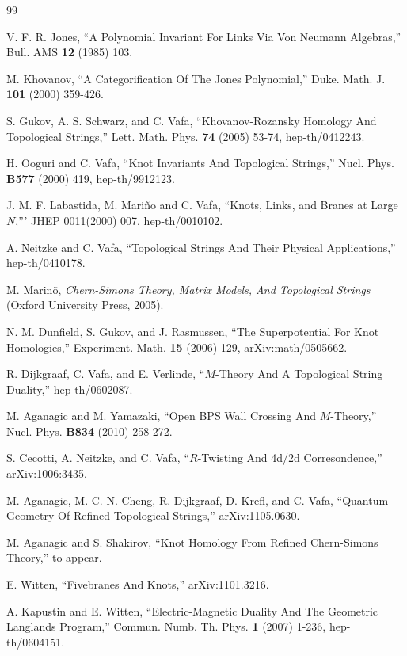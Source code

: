 
\begin{thebibliography}{99}


V. F. R. Jones, ``A Polynomial Invariant For Links Via Von Neumann Algebras,'' Bull.
AMS {\bf{12}} (1985) 103.

M. Khovanov, ``A Categorification Of The Jones Polynomial,'' Duke. Math. J. {\bf
101} (2000)
359-426.

S. Gukov, A. S. Schwarz, and C. Vafa,
``Khovanov-Rozansky Homology And Topological Strings,''
Lett. Math. Phys. {\bf 74} (2005) 53-74, hep-th/0412243.

H. Ooguri and C. Vafa, ``Knot Invariants And Topological Strings,''  Nucl. Phys.
{\bf{B577}}
(2000) 419, hep-th/9912123.

J. M. F. Labastida, M. Mari\~no and C. Vafa, ``Knots, Links, and Branes at Large $N$,'''
JHEP 0011(2000) 007, hep-th/0010102.



A. Neitzke and C. Vafa, ``Topological Strings And Their Physical Applications,''  hep-th/0410178.

M. Marin\~o,  {\it Chern-Simons Theory, Matrix Models, And Topological Strings} 
(Oxford University Press, 2005).


N. M. Dunfield, S. Gukov, and J. Rasmussen, ``The Superpotential For Knot Homologies,''
Experiment. Math. {\bf 15} (2006) 129, arXiv:math/0505662.

R. Dijkgraaf, C. Vafa, and E. Verlinde, ``$M$-Theory And A Topological String Duality,''
hep-th/0602087.

M. Aganagic and M. Yamazaki,  ``Open BPS Wall Crossing And $M$-Theory,'' Nucl. Phys.
{\bf B834} (2010) 258-272.

 S. Cecotti, A. Neitzke, and C. Vafa, ``$R$-Twisting And 4d/2d Corresondence,''
arXiv:1006:3435.

M. Aganagic, M. C. N. Cheng, R. Dijkgraaf, D. Krefl, and C. Vafa,
``Quantum Geometry Of Refined Topological Strings,'' arXiv:1105.0630.

M. Aganagic and S. Shakirov, ``Knot Homology From Refined Chern-Simons Theory,''
to appear.

E. Witten, ``Fivebranes And Knots,'' arXiv:1101.3216.

A. Kapustin and E. Witten, ``Electric-Magnetic Duality And The Geometric Langlands
Program,''  Commun. Numb. Th. Phys. {\bf 1} (2007) 1-236,
hep-th/0604151.



\end{thebibliography}
